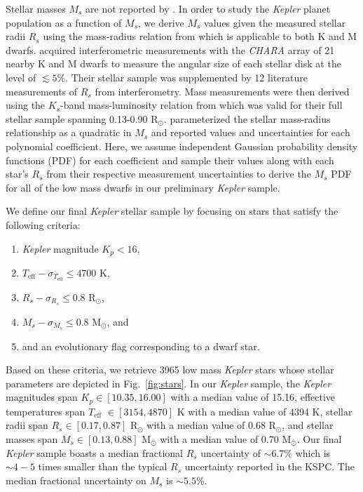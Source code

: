 \documentclass[twocolumn]{emulateapj}
\newcommand{\kepler}[1]{\emph{Kepler}#1}
\newcommand{\teff}[1]{$T_{\text{eff}}$#1}
\begin{document}
Stellar masses $M_s$ are not reported by \cite{berger18}. In order to study the \kepler{} planet population as a function of $M_s$,
we derive $M_s$ values given the measured stellar radii $R_s$ using the mass-radius relation from \cite{boyajian12} which is
applicable to both K and M dwarfs.
\cite{boyajian12} acquired interferometric measurements with the \emph{CHARA} array of 21 nearby K and M dwarfs
to measure the angular size of each stellar disk at the level of $\lesssim 5$\%. Their stellar sample was supplemented by 12
literature measurements of $R_s$ from interferometry. Mass measurements were then derived using the $K_s$-band mass-luminosity
relation from \cite{henry93} which was valid for their full stellar sample spanning 0.13-0.90 R$_{\odot}$. \cite{boyajian12}
parameterized the stellar mass-radius relationship as a quadratic in $M_s$ and reported values and uncertainties for each polynomial
coefficient. Here, we assume independent Gaussian probability density functions (PDF) for each coefficient and sample their values
along with each star's $R_s$ from their respective measurement uncertainties to derive the $M_s$ PDF for all of the low mass dwarfs
in our preliminary \kepler{} sample.

We define our final \kepler{} stellar sample by focusing on stars that satisfy the following criteria:

\begin{enumerate}
\item \kepler{} magnitude $K_p < 16$,
\item $T_{\text{eff}} - \sigma_{T_{\text{eff}}} \leq 4700$ K,
\item $R_s - \sigma_{R_s} \leq 0.8$ R$_{\odot}$,
\item $M_s - \sigma_{M_s} \leq 0.8$ M$_{\odot}$, and
\item and an evolutionary flag corresponding to a dwarf star. 
\end{enumerate}

\noindent Based on these criteria, we retrieve 3965 low mass \kepler{} stars whose
stellar parameters are depicted in Fig.~\ref{fig:stars}.
In our \kepler{} sample, the \kepler{} magnitudes span $K_p \in [10.35, 16.00]$ with a median value of 15.16,
effective temperatures span \teff{} $\in [3154, 4870]$ K with a median value of 4394 K,
stellar radii span $R_s \in [0.17, 0.87]$ R$_{\odot}$ with a median value of 0.68 R$_{\odot}$, and
stellar masses span $M_s \in [0.13, 0.88]$ M$_{\odot}$ with a median value of 0.70 M$_{\odot}$.
Our final \kepler{} sample boasts a median fractional $R_s$ uncertainty of $\sim 6.7$\% which is $\sim 4-5$
times smaller than the typical $R_s$ uncertainty reported in the KSPC. The median fractional uncertainty on
$M_s$ is $\sim 5.5$\%.
\end{document}
